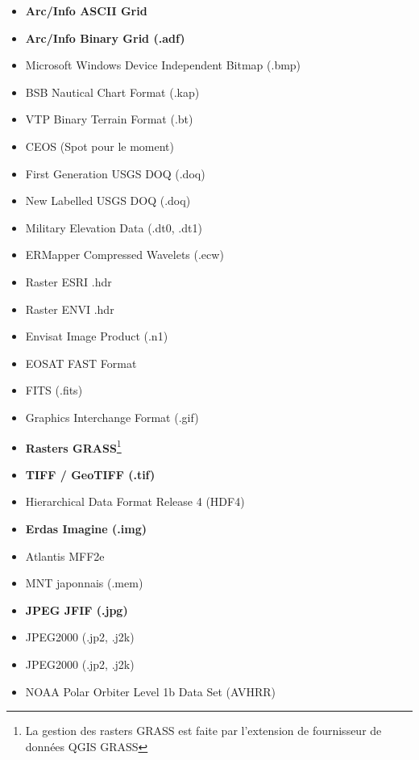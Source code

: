 \begin{itemize}
\item \textbf{Arc/Info ASCII Grid}
\item \textbf{Arc/Info Binary Grid (.adf)}
\item Microsoft Windows Device Independent Bitmap (.bmp)
\item BSB Nautical Chart Format (.kap)
\item VTP Binary Terrain Format (.bt)
\item CEOS (Spot pour le moment)
\item First Generation USGS DOQ (.doq)
\item New Labelled USGS DOQ (.doq)
\item Military Elevation Data (.dt0, .dt1)
\item ERMapper Compressed Wavelets (.ecw)
\item Raster ESRI .hdr
\item Raster ENVI .hdr
\item Envisat Image Product (.n1)
\item EOSAT FAST Format
\item FITS (.fits)
\item Graphics Interchange Format (.gif)
\item \textbf{Rasters GRASS}\footnote{La gestion des rasters GRASS est faite par l'extension de fournisseur de donn\'ees QGIS GRASS} 
\item \textbf{TIFF / GeoTIFF (.tif)}
\item Hierarchical Data Format Release 4 (HDF4)
\item \textbf{Erdas Imagine (.img)}
\item Atlantis MFF2e
\item MNT japonnais (.mem)
\item \textbf{JPEG JFIF (.jpg)}
\item JPEG2000 (.jp2, .j2k)
\item JPEG2000 (.jp2, .j2k)
\item NOAA Polar Orbiter Level 1b Data Set (AVHRR)

\end{itemize}
